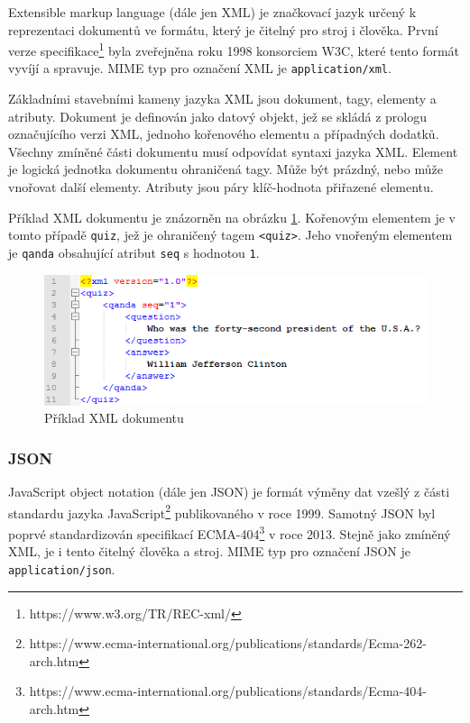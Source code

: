 \documentclass[czech,DP]{thesiskiv}
\begin{document}
Extensible markup language (dále jen XML) je značkovací jazyk určený k reprezentaci dokumentů ve formátu, který je čitelný pro stroj i člověka. První verze specifikace\footnote{https://www.w3.org/TR/REC-xml/} byla zveřejněna roku 1998 konsorciem W3C, které tento formát vyvíjí a spravuje. MIME typ pro označení XML je \verb|application/xml|.

Základními stavebními kameny jazyka XML jsou dokument, tagy, elementy a atributy. Dokument je definován jako datový objekt, jež se skládá z prologu označujícího verzi XML, jednoho kořenového elementu a případných dodatků. Všechny zmíněné části dokumentu musí odpovídat syntaxi jazyka XML. Element je logická jednotka dokumentu ohraničená tagy. Může být prázdný, nebo může vnořovat další elementy. Atributy jsou páry klíč-hodnota přiřazené elementu.

Příklad XML dokumentu je znázorněn na obrázku \ref{fig:xml-example}. Kořenovým elementem je v tomto případě \verb|quiz|, jež je ohraničený tagem \verb|<quiz>|. Jeho vnořeným elementem je \verb|qanda| obsahující atribut \verb|seq| s hodnotou \verb|1|.

\begin{figure}[h]
	\centering
	\includegraphics[width=12.5cm]{xml-example.png}
	\caption{Příklad XML dokumentu}
	\label{fig:xml-example}
\end{figure} 

\subsubsection{JSON} 
JavaScript object notation (dále jen JSON) je formát výměny dat vzešlý z části standardu jazyka JavaScript\footnote{https://www.ecma-international.org/publications/standards/Ecma-262-arch.htm} publikovaného v roce 1999. Samotný JSON byl poprvé standardizován specifikací ECMA-404\footnote{https://www.ecma-international.org/publications/standards/Ecma-404-arch.htm} v roce 2013. Stejně jako zmíněný XML, je i tento čitelný člověka a stroj.  MIME typ pro označení JSON je \verb|application/json|.
\end{document}
